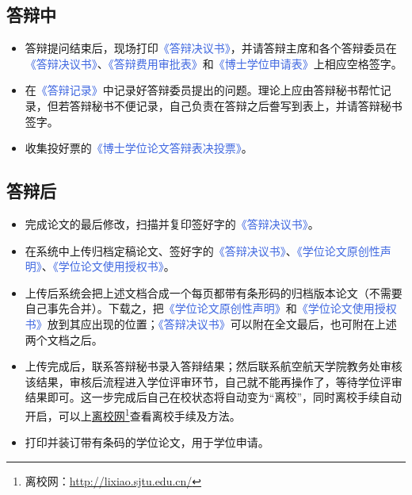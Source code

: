 \documentclass[a4paper, 12pt]{ctexart}
\newcommand{\form}[1]{\textcolor{RoyalBlue}{《#1》}}
\begin{document}
\hypertarget{dbz}{\subsection{答辩中}}
\begin{itemize}
    \item 答辩提问结束后，现场打印\form{答辩决议书}，并请答辩主席和各个答辩委员在\form{答辩决议书}、\form{答辩费用审批表}和\form{博士学位申请表}上相应空格签字。
    \item 在\form{答辩记录}中记录好答辩委员提出的问题。理论上应由答辩秘书帮忙记录，但若答辩秘书不便记录，自己负责在答辩之后誊写到表上，并请答辩秘书签字。
    \item 收集投好票的\form{博士学位论文答辩表决投票}。
\end{itemize}

\subsection{答辩后}
    \begin{itemize}
        \item 完成论文的最后修改，扫描并复印签好字的\form{答辩决议书}。
        \item 在系统中上传归档定稿论文、签好字的\form{答辩决议书}、\form{学位论文原创性声明}、\form{学位论文使用授权书}。
        \item 上传后系统会把上述文档合成一个每页都带有条形码的归档版本论文（不需要自己事先合并）。下载之，把\form{学位论文原创性声明}和\form{学位论文使用授权书}放到其应出现的位置；\form{答辩决议书}可以附在全文最后，也可附在上述两个文档之后。
        \item 上传完成后，联系答辩秘书录入答辩结果；然后联系航空航天学院教务处审核该结果，审核后流程进入学位评审环节，自己就不能再操作了，等待学位评审结果即可。这一步完成后自己在校状态将自动变为“离校”，同时离校手续自动开启，可以上\href{http://lixiao.sjtu.edu.cn/}{离校网}\footnote{离校网：\url{http://lixiao.sjtu.edu.cn/}}查看离校手续及方法。
        \item 打印并装订带有条码的学位论文，用于学位申请。
    \end{itemize}
\end{document}
